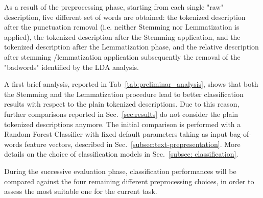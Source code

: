 \documentclass[10pt]{article}
\begin{document}
As a result of the preprocessing phase, starting from each single "raw" description, five different set of words are obtained: the tokenized description after the punctuation removal (i.e. neither Stemming nor Lemmatization is applied), the tokenized description after the Stemming application, and the tokenized description after the Lemmatization phase, and the relative description after stemming /lemmatization application subsequently the removal of the "badwords" identified by the LDA analysis.

\begin{table}[]
\caption{\label{tab:preliminar_analysis}The preliminary analysis results, leading to the not consideration of the "Plain Tokenized" approach, in favour of both the Stemming and Lemmatization procedures.}
\end{table}

A first brief analysis, reported in Tab~\ref{tab:preliminar_analysis}, shows that both the Stemming and the Lemmatization procedure lead to better classification results with respect to the plain tokenized descriptions. Due to this reason, further comparisons reported in Sec.~\ref{sec:results} do not consider the plain tokenized descriptions anymore. The initial comparison is performed with a Random Forest Classifier with fixed default parameters taking as input bag-of-words feature vectors, described in Sec.~\ref{subsec:text-prepresentation}. More details on the choice of classification models in Sec.~\ref{subsec: classification}.

During the successive evaluation phase, classification performances will be compared against the four remaining different preprocessing choices, in order to assess the most suitable one for the current task. 
\end{document}
